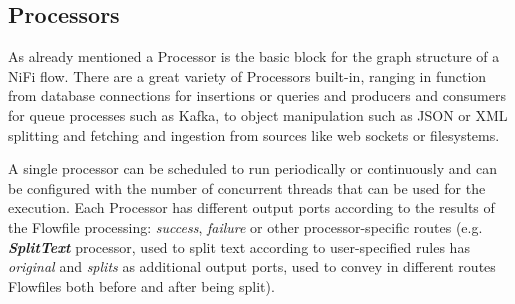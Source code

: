 \subsection{Processors}

As already mentioned a Processor is the basic block for the graph structure of a NiFi flow. There are a great variety of Processors built-in, ranging in function from database connections for insertions or queries and producers and consumers for queue processes such as Kafka, to object manipulation such as JSON or XML splitting and fetching and ingestion from sources like web sockets or filesystems.

A single processor can be scheduled to run periodically or continuously and can be configured with the number of concurrent threads that can be used for the execution. Each Processor has different output ports according to the results of the Flowfile processing: \textit{success}, \textit{failure} or other processor-specific routes (e.g. \textit{\textbf{SplitText}} processor, used to split text according to user-specified rules has \textit{original} and \textit{splits} as additional output ports, used to convey in different routes Flowfiles both before and after being split).